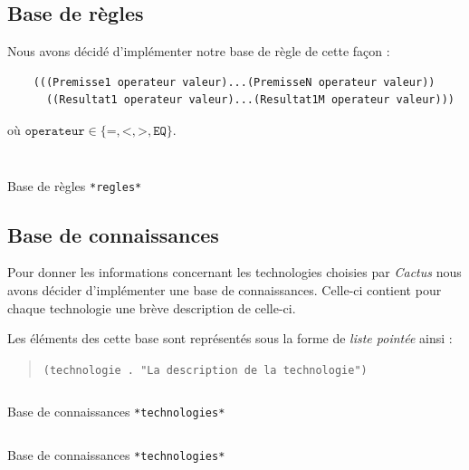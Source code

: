 \documentclass[a4paper,12pt]{article}
\begin{document}
\subsection{Base de règles}
Nous avons décidé d'implémenter notre base de règle de cette façon :

\begin{verbatim}
	(((Premisse1 operateur valeur)...(PremisseN operateur valeur))
  	  ((Resultat1 operateur valeur)...(Resultat1M operateur valeur)))
\end{verbatim}
où $\texttt{operateur} \in \{\texttt{=},\texttt{<},\texttt{>},\texttt{EQ}\} $.
\begin{listing}[H]
	\centering
	\inputminted[breaklines=true,linenos,lastline=50]{lisp}{../regles.lisp}
\end{listing}

\begin{listing}[H]
	\centering
	\inputminted[breaklines=true,linenos,firstline=51]{lisp}{../regles.lisp}
	\caption{Base de règles \texttt{*regles*}}
\end{listing}

\subsection{Base de connaissances}
Pour donner les informations concernant les technologies choisies par \textit{Cactus} nous avons décider d'implémenter une base de connaissances. Celle-ci contient pour chaque technologie une brève description de celle-ci.

Les éléments des cette base sont représentés sous la forme de \textit{liste pointée} ainsi :

\begin{quotation}
	\texttt{(technologie . "La description de la technologie")}
\end{quotation}

\begin{listing}[H]
	\centering
	\inputminted[breaklines=true,linenos,lastline=26]{lisp}{../technologies.lisp}
	\caption{Base de connaissances \texttt{*technologies*}}
\end{listing}

\begin{listing}[H]
	\centering
	\inputminted[breaklines=true,linenos,firstline=27]{lisp}{../technologies.lisp}
	\caption{Base de connaissances \texttt{*technologies*}}
\end{listing}
\end{document}
